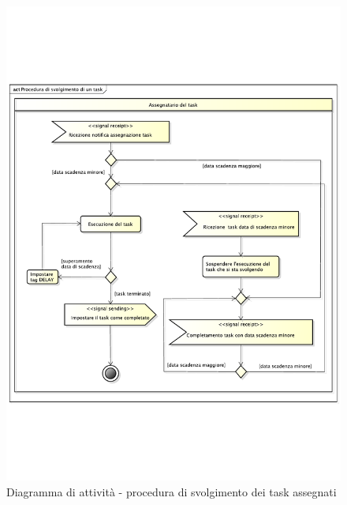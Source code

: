 				\begin{figure}[htbp]
					\centering
					\includegraphics[width=14cm]{images/proc_svolgimento_task.pdf}
					\caption{Diagramma di attività - procedura di svolgimento dei task assegnati}
					\label{fig:procedura_svolgimento_task}
				\end{figure}

